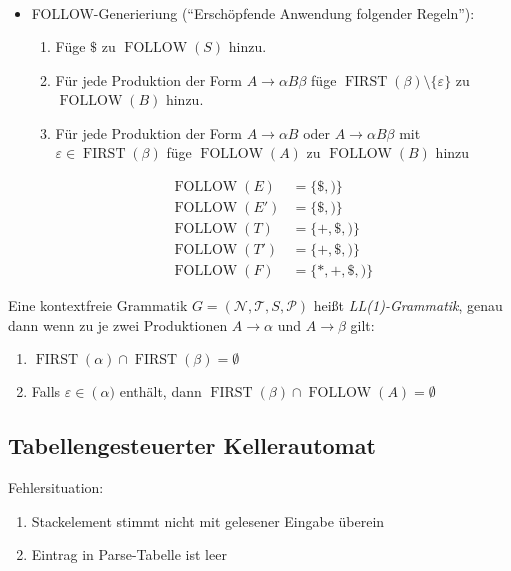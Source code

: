 \begin{itemize}
\begin{align*}
        \end{align*}
 \item FOLLOW-Generieriung ("`Erschöpfende Anwendung folgender Regeln"'):
     \begin{enumerate}
      \item Füge $\$$ zu $\operatorname{FOLLOW}(S)$ hinzu.
      \item Für jede Produktion der Form $A \to \alpha B \beta$ füge $\operatorname{FIRST}(\beta) \setminus \{\varepsilon\}$ zu $\operatorname{FOLLOW}(B)$ hinzu.
      \item Für jede Produktion der Form $A \to \alpha B$ oder $A \to \alpha B \beta$ mit $\varepsilon \in \operatorname{FIRST}(\beta)$ füge $\operatorname{FOLLOW}(A)$ zu $\operatorname{FOLLOW}(B)$ hinzu
     \end{enumerate}
  \Bsp  \begin{align*}
         \operatorname{FOLLOW}(E) &= \{\$,)\} \\
         \operatorname{FOLLOW}(E') &= \{\$,)\} \\
         \operatorname{FOLLOW}(T) &= \{+,\$, )\} \\
         \operatorname{FOLLOW}(T') &= \{+, \$, )\} \\
         \operatorname{FOLLOW}(F) &= \{*, +, \$, )\}
        \end{align*}
\end{itemize}
\Defi Eine kontextfreie Grammatik $G = (\mathcal{N},\mathcal{T},S,\mathcal{P})$ heißt \emph{LL(1)-Grammatik}, genau dann wenn zu je zwei Produktionen $A \to \alpha$ und $A \to \beta$ gilt:
\begin{enumerate}
 \item $\operatorname{FIRST}(\alpha) \cap \operatorname{FIRST}(\beta) = \emptyset$
 \item Falls $\varepsilon \in \operatorname(\alpha)$ enthält, dann $\operatorname{FIRST}(\beta) \cap \operatorname{FOLLOW}(A) = \emptyset$
\end{enumerate}

\subsection{Tabellengesteuerter Kellerautomat}
Fehlersituation:
\begin{enumerate}
 \item Stackelement stimmt nicht mit gelesener Eingabe überein
 \item Eintrag in Parse-Tabelle ist leer
\end{enumerate}

